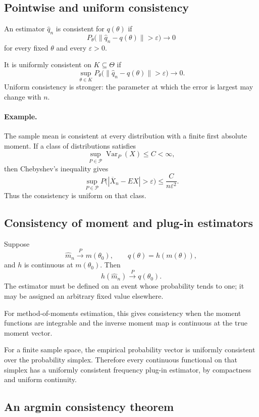 \subsection{Pointwise and uniform consistency}

An estimator $\widehat q_n$ is consistent for $q(\theta)$ if
\[
P_\theta\bigl(\|\widehat q_n-q(\theta)\|>\varepsilon\bigr)
\longrightarrow0
\]
for every fixed $\theta$ and every $\varepsilon>0$.

It is uniformly consistent on $K\subseteq\Theta$ if
\[
\sup_{\theta\in K}
P_\theta\bigl(\|\widehat q_n-q(\theta)\|>\varepsilon\bigr)
\longrightarrow0.
\]
Uniform consistency is stronger: the parameter at which the error
is largest may change with $n$.

\paragraph{Example.}
The sample mean is consistent at every distribution with a finite
first absolute moment. If a class of distributions satisfies
\[
\sup_{P\in\mathcal P}\operatorname{Var}_P(X)\leq C<\infty,
\]
then Chebyshev's inequality gives
\[
\sup_{P\in\mathcal P}
P\bigl(|\overline X_n-EX|>\varepsilon\bigr)
\leq\frac{C}{n\varepsilon^2}.
\]
Thus the consistency is uniform on that class.

\subsection{Consistency of moment and plug-in estimators}

Suppose
\[
\widehat m_n\xrightarrow{P}m(\theta_0),
\qquad
q(\theta)=h(m(\theta)),
\]
and $h$ is continuous at $m(\theta_0)$. Then
\[
h(\widehat m_n)\xrightarrow{P}q(\theta_0).
\]
The estimator must be defined on an event whose probability tends
to one; it may be assigned an arbitrary fixed value elsewhere.

For method-of-moments estimation, this gives consistency when the
moment functions are integrable and the inverse moment map is
continuous at the true moment vector.

For a finite sample space, the empirical probability vector is
uniformly consistent over the probability simplex. Therefore every
continuous functional on that simplex has a uniformly consistent
frequency plug-in estimator, by compactness and uniform continuity.

\subsection{An argmin consistency theorem}

